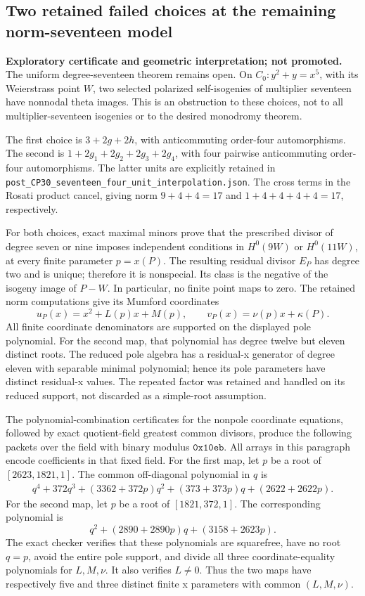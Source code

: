 \subsection*{Two retained failed choices at the remaining norm-seventeen model}

\textbf{Exploratory certificate and geometric interpretation; not promoted.}
The uniform degree-seventeen theorem remains open.  On
\(C_0:y^2+y=x^5\), with its Weierstrass point \(W\), two selected
polarized self-isogenies of multiplier seventeen have nonnodal theta images.
This is an obstruction to these choices, not to all multiplier-seventeen
isogenies or to the desired monodromy theorem.

The first choice is \(3+2g+2h\), with anticommuting order-four
automorphisms.  The second is
\(1+2g_1+2g_2+2g_3+2g_4\), with four pairwise anticommuting
order-four automorphisms.  The latter units are explicitly retained in
\texttt{post\_CP30\_seventeen\_four\_unit\_interpolation.json}.
The cross terms in the Rosati product cancel, giving norm
\(9+4+4=17\) and \(1+4+4+4+4=17\), respectively.

For both choices, exact maximal minors prove that the prescribed divisor
of degree seven or nine imposes independent conditions in
\(H^0(9W)\) or \(H^0(11W)\), at every finite parameter \(p=x(P)\).
The resulting residual divisor \(E_P\) has degree two and is unique;
therefore it is nonspecial.  Its class is the negative of the isogeny
image of \(P-W\).  In particular, no finite point maps to zero.
The retained norm computations give its Mumford coordinates
\[
 u_P(x)=x^2+L(p)x+M(p),\qquad
 v_P(x)=\nu(p)x+\kappa(P).
\]
All finite coordinate denominators are supported on the displayed pole
polynomial.  For the second map, that polynomial has degree twelve but
eleven distinct roots.  The reduced pole algebra has a residual-x
generator of degree eleven with separable minimal polynomial; hence its
pole parameters have distinct residual-x values.  The repeated factor
was retained and handled on its reduced support, not discarded as a
simple-root assumption.

The polynomial-combination certificates for the nonpole coordinate
equations, followed by exact quotient-field greatest common divisors,
produce the following packets over the field with binary modulus
\(\texttt{0x10eb}\).  All arrays in this paragraph encode coefficients
in that fixed field.  For the first map, let \(p\) be a root of
\([2623,1821,1]\).  The common off-diagonal polynomial in \(q\) is
\[
\begin{split}
 q^4+372q^3+(3362+372p)q^2
 +(373+373p)q+(2622+2622p).
\end{split}
\]
For the second map, let \(p\) be a root of
\([1821,372,1]\).  The corresponding polynomial is
\[
 q^2+(2890+2890p)q+(3158+2623p).
\]
The exact checker verifies that these polynomials are squarefree, have
no root \(q=p\), avoid the entire pole support, and divide all three
coordinate-equality polynomials for \(L,M,\nu\).  It also verifies
\(L\ne0\).  Thus the two maps have respectively five and three
distinct finite x parameters with common \((L,M,\nu)\).

